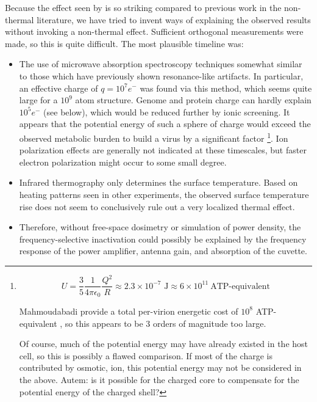 \documentclass[paper.tex]{subfiles}
\begin{document}
\begin{multicols}{1}
Because the effect seen by\cite{Efficient2015} is so striking compared to previous work in the non-thermal literature, we have tried to invent ways of explaining the observed results without invoking a non-thermal effect. Sufficient orthogonal measurements were made, so this is quite difficult. The most plausible timeline was:
\begin{itemize}
	\item The use of microwave absorption spectroscopy techniques somewhat similar to those which have previously shown resonance-like artifacts\cite{Resonances1987}. In particular, an effective charge of $q=10^7 e^-$ was found via this method, which seems quite large for a $10^9$ atom structure. Genome and protein charge can hardly explain $10^5 e^-$ (see below), which would be reduced further by ionic screening. It appears that the potential energy of such a sphere of charge would exceed the observed metabolic burden to build a virus by a significant factor \footnote{
		$$ U = \frac{3}{5}  \frac{1}{4 \pi \epsilon_0} \frac{Q^2}{R} \approx 2.3
		\times10^{-7} \text{ J} \approx 6 \times 10^{11}\  \text{ATP-equivalent} $$
		
		
		Mahmoudabadi\cite{Energetic2017} provide a total per-virion energetic cost of $10^8 $ ATP-equivalent , so this appears to be 3 orders of magnitude too large.
		
		Of course, much of the potential energy may have already existed in the host cell, so this is possibly a flawed comparison. If most of the charge is contributed by osmotic, ion, this potential energy may not be considered in the above. Autem: is it possible for the charged core to compensate for the potential energy of the charged shell?}. Ion polarization effects are generally not indicated at these timescales\cite{ICNIRP2020}, but faster electron polarization might occur to some small degree. 
	
	
	
	
	\item Infrared thermography only determines the surface temperature. Based on heating patterns seen in other experiments\cite{Effects1950}, the observed surface temperature rise does not seem to conclusively rule out a very localized thermal effect. 
	\item Therefore, without free-space dosimetry or simulation of power density, the frequency-selective inactivation could possibly be explained by the frequency response of the power amplifier, antenna gain, and absorption of the cuvette.
\end{itemize}


\end{multicols}
\end{document}
